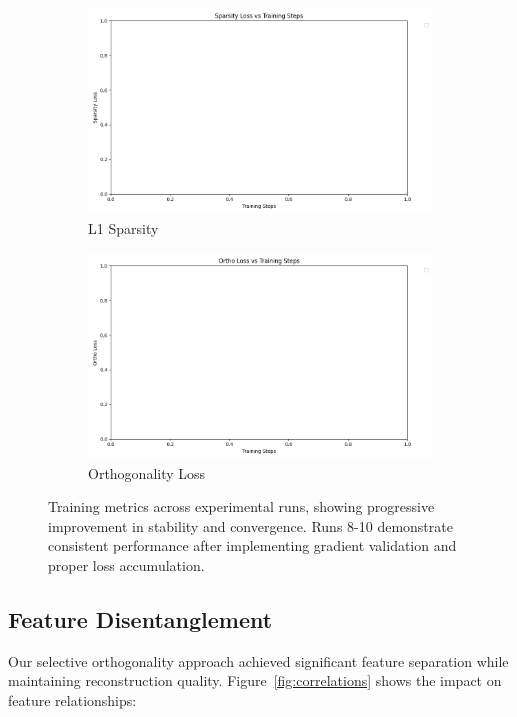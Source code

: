 \documentclass{article} %
\begin{document}
\begin{figure}[h]
    \hfill
    \begin{subfigure}{0.24\textwidth}
        \includegraphics[width=\textwidth]{sparsity_loss_comparison.png}
        \caption{L1 Sparsity}
        \label{fig:sparsity}
    \end{subfigure}
    \hfill
    \begin{subfigure}{0.24\textwidth}
        \includegraphics[width=\textwidth]{ortho_loss_comparison.png}
        \caption{Orthogonality Loss}
        \label{fig:ortho}
    \end{subfigure}
    \caption{Training metrics across experimental runs, showing progressive improvement in stability and convergence. Runs 8-10 demonstrate consistent performance after implementing gradient validation and proper loss accumulation.}
    \label{fig:training}
\end{figure}

\subsection{Feature Disentanglement}
Our selective orthogonality approach achieved significant feature separation while maintaining reconstruction quality. Figure~\ref{fig:correlations} shows the impact on feature relationships:
\end{document}
